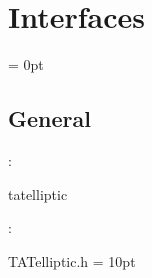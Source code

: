 
\section{Interfaces} 


\parskip = 0pt

\vspace{3mm} \subsection*{General}

: 

tatelliptic
\vspace{2mm}

\vspace{5mm}

: 



TATelliptic.h
\vspace{2mm}\parskip = 10pt 
